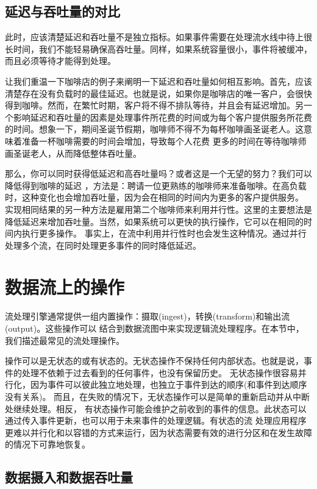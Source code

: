\documentclass[oneside]{ctexbook}
\begin{document}
\subsection{延迟与吞吐量的对比}

此时，应该清楚延迟和吞吐量不是独立指标。如果事件需要在处理流水线中待上很长时间，我们不能轻易确保高吞吐量。同样，如果系统容量很小，事件将被缓冲，而且必须等待才能得到处理。

让我们重温一下咖啡店的例子来阐明一下延迟和吞吐量如何相互影响。首先，应该清楚存在没有负载时的最佳延迟。也就是说，如果你是咖啡店的唯一客户，会很快得到咖啡。然而，在繁忙时期，客户将不得不排队等待，并且会有延迟增加。另一个影响延迟和吞吐量的因素是处理事件所花费的时间或为每个客户提供服务所花费的时间。想象一下，期间圣诞节假期，咖啡师不得不为每杯咖啡画圣诞老人。这意味着准备一杯咖啡需要的时间会增加，导致每个人花费
更多的时间在等待咖啡师画圣诞老人，从而降低整体吞吐量。

那么，你可以同时获得低延迟和高吞吐量吗？或者这是一个无望的努力？我们可以降低得到咖啡的延迟
，方法是：聘请一位更熟练的咖啡师来准备咖啡。在高负载时，这种变化也会增加吞吐量，因为会在相同的时间内为更多的客户提供服务。
实现相同结果的另一种方法是雇用第二个咖啡师来利用并行性。这里的主要想法是降低延迟来增加吞吐量。当然，如果系统可以更快的执行操作，它可以在相同的时间内执行更多操作。
事实上，在流中利用并行性时也会发生这种情况。通过并行处理多个流，在同时处理更多事件的同时降低延迟。

\section{数据流上的操作}

流处理引擎通常提供一组内置操作：摄取(ingest)，转换(transform)和输出流(output)。这些操作可以
结合到数据流图中来实现逻辑流处理程序。在本节中，我们描述最常见的流处理操作。

操作可以是无状态的或有状态的。无状态操作不保持任何内部状态。也就是说，事件的处理不依赖于过去看到的任何事件，也没有保留历史。
无状态操作很容易并行化，因为事件可以彼此独立地处理，也独立于事件到达的顺序(和事件到达顺序没有关系)。
而且，在失败的情况下，无状态操作可以是简单的重新启动并从中断处继续处理。相反，
有状态操作可能会维护之前收到的事件的信息。此状态可以通过传入事件更新，也可以用于未来事件的处理逻辑。有状态的流
处理应用程序更难以并行化和以容错的方式来运行，因为状态需要有效的进行分区和在发生故障的情况下可靠地恢复。

\subsection{数据摄入和数据吞吐量}
\end{document}
